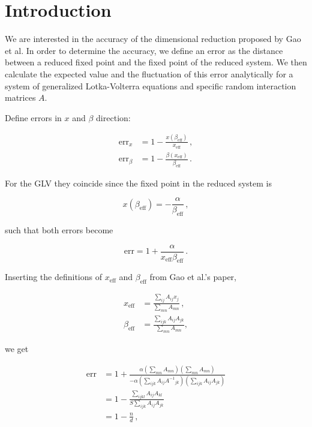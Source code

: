 \documentclass[10pt]{article}
\begin{document}
\section{Introduction}
\label{sec:introduction}

We are interested in the accuracy of the dimensional reduction proposed by Gao et al.
In order to determine the accuracy, we define an error as the distance between a reduced 
fixed point and the fixed point of the reduced system. We then calculate the expected value and the 
fluctuation of this error analytically for a system of generalized Lotka-Volterra equations 
and specific random interaction matrices $A$. 

Define errors in $x$ and $\beta$ direction:

\begin{align}
    \mathrm{err}_x &= 1 - \frac{x(\beta_\mathrm{eff})}{x_\mathrm{eff}} \,, \\
    \mathrm{err}_\beta &= 1 - \frac{\beta(x_\mathrm{eff})}{\beta_\mathrm{eff}} \,.
\end{align}

For the GLV they coincide since  the fixed point in the reduced system is

\begin{equation}
    x(\beta_\mathrm{eff}) = - \frac{\alpha}{\beta_\mathrm{eff}} \,,
\end{equation}

such that both errors become

\begin{equation}
    \mathrm{err} = 1 + \frac{\alpha}{x_\mathrm{eff} \beta_\mathrm{eff}} \,.
\end{equation}

Inserting the definitions of $x_\mathrm{eff}$ and $\beta_\mathrm{eff}$ from Gao et al.'s paper, 

\begin{align}
    x_\mathrm{eff} &= \frac{\sum_{ij} A_{ij} x_j}{\sum_{mn} A_{mn}} \,, \\  
    \beta_\mathrm{eff} &= \frac{\sum_{ijk} A_{ij} A_{jk} }{\sum_{mn} A_{mn}},
\end{align}

we get 

\begin{equation}
    \begin{split}
        \mathrm{err} 
            &= 1 + \frac{\alpha \left(\sum_{mn} A_{mn}\right) \left(\sum_{mn} A_{mn}\right)   
                }{- \alpha \left( \sum_{ijk} A_{ij} {A^{-1}}_{jk} \right) \left(\sum_{ijk} A_{ij} A_{jk}\right)}  \\ 
            &= 1 - \frac{\sum_{ijkl} A_{ij} A_{kl} }{ S \sum_{ijk} A_{ij} A_{jk} } \\
            &= 1 - \frac{n}{d} \,,
    \end{split}
\end{equation}
\end{document}
